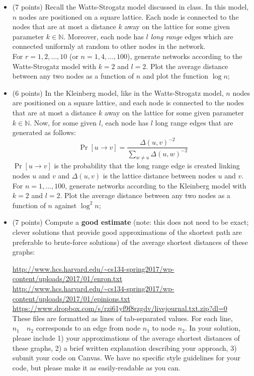 \documentclass[11pt]{article} %
\begin{document}
\begin{itemize}
\item (7 points) Recall the Watts-Strogatz model discussed in class. In this model, $n$ nodes are positioned on a square lattice. Each node is connected to the nodes that are at most a distance $k$ away on the lattice for some given parameter $k \in \mathbb{N}$. Moreover, each node has $l$ \textit{long range} edges which are connected uniformly at random to other nodes in the network. \\
For $r = 1, 2, \ldots, 10$ (or $n = 1, 4, \ldots, 100$), generate networks according to the Watts-Strogatz model with $k = 2$ and $l = 2$. Plot the average distance between any two nodes as a function of $n$ and plot the function $\log n$;

\item (6 points) In the Kleinberg model, like in the Watts-Strogatz model, $n$ nodes are positioned on a square lattice, and each node is connected to the nodes that are at most a distance $k$ away on the lattice for some given parameter $k \in \mathbb{N}$. Now, for some given $l$, each node has $l$ long range edges that are generated as follows:
$$\Pr[u \to v] = \frac{\Delta(u,v)^{-2}}{\sum\limits_{w \not= u} \Delta(u,w)^{-2}}$$
$\Pr[u \to v]$ is the probability that the long range edge is created linking nodes $u$ and $v$ and $\Delta(u,v)$ is the lattice distance between nodes $u$ and $v$. \\
For $n = 1, \ldots, 100$, generate networks according to the Kleinberg model with $k = 2$ and $l = 2$. Plot the average distance between any two nodes as a function of $n$ against $\log^2 n$;

\item (7 points) Compute a \textbf{good estimate} (note: this does not need to be exact; clever solutions that provide good approximations of the shortest path are preferable to brute-force solutions) of the average shortest distances of these graphs: 

\url{http://www.hcs.harvard.edu/~cs134-spring2017/wp-content/uploads/2017/01/enron.txt} \\
\url{http://www.hcs.harvard.edu/~cs134-spring2017/wp-content/uploads/2017/01/epinions.txt} \\
\url{https://www.dropbox.com/s/rzi61yf9f8rzgdv/livejournal.txt.zip?dl=0}\\

These files are formatted as lines of tab-separated values. For each line, $n_1 \quad n_2$ corresponds to an edge from node $n_1$ to node $n_2$. In your solution, please include 1) your approximations of the average shortest distances of these graphs, 2) a brief written explanation describing your approach, 3) submit your code on Canvas. We have no specific style guidelines for your code, but please make it as easily-readable as you can.

\end{itemize}
\end{document}
